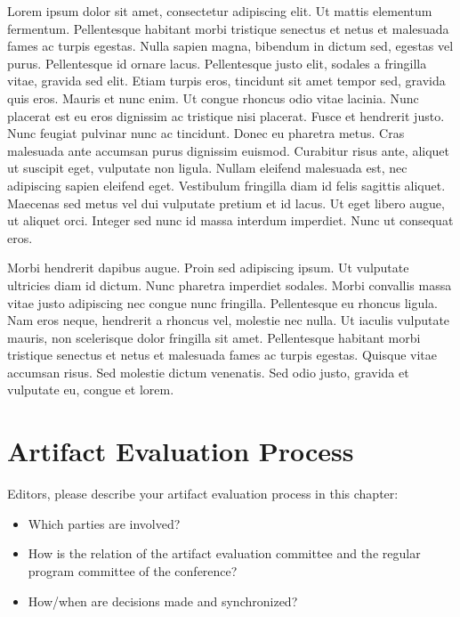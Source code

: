 \documentclass[a4paper,UKenglish]{dartsmaster-v2019}
\begin{document}
Lorem ipsum dolor sit amet, consectetur adipiscing elit. Ut mattis
elementum fermentum. Pellentesque habitant morbi tristique senectus et
netus et malesuada fames ac turpis egestas. Nulla sapien magna,
bibendum in dictum sed, egestas vel purus. Pellentesque id ornare
lacus. Pellentesque justo elit, sodales a fringilla vitae, gravida sed
elit. Etiam turpis eros, tincidunt sit amet tempor sed, gravida quis
eros. Mauris et nunc enim. Ut congue rhoncus odio vitae lacinia. Nunc
placerat est eu eros dignissim ac tristique nisi placerat. Fusce et
hendrerit justo. Nunc feugiat pulvinar nunc ac tincidunt. Donec eu
pharetra metus. Cras malesuada ante accumsan purus dignissim
euismod. Curabitur risus ante, aliquet ut suscipit eget, vulputate non
ligula. Nullam eleifend malesuada est, nec adipiscing sapien eleifend
eget. Vestibulum fringilla diam id felis sagittis aliquet. Maecenas
sed metus vel dui vulputate pretium et id lacus. Ut eget libero augue,
ut aliquet orci. Integer sed nunc id massa interdum imperdiet. Nunc ut
consequat eros.

Morbi hendrerit dapibus augue. Proin sed adipiscing ipsum. Ut
vulputate ultricies diam id dictum. Nunc pharetra imperdiet
sodales. Morbi convallis massa vitae justo adipiscing nec congue nunc
fringilla. Pellentesque eu rhoncus ligula. Nam eros neque, hendrerit a
rhoncus vel, molestie nec nulla. Ut iaculis vulputate mauris, non
scelerisque dolor fringilla sit amet. Pellentesque habitant morbi
tristique senectus et netus et malesuada fames ac turpis
egestas. Quisque vitae accumsan risus. Sed molestie dictum
venenatis. Sed odio justo, gravida et vulputate eu, congue et lorem.

\chapter{Artifact Evaluation Process}
Editors, please describe your artifact evaluation process in this chapter:
\begin{itemize}
\item Which parties are involved?
\item How is the relation of the artifact
evaluation committee and the regular program committee of the conference?
\item How/when are decisions made and synchronized?
\end{itemize}
\end{document}
